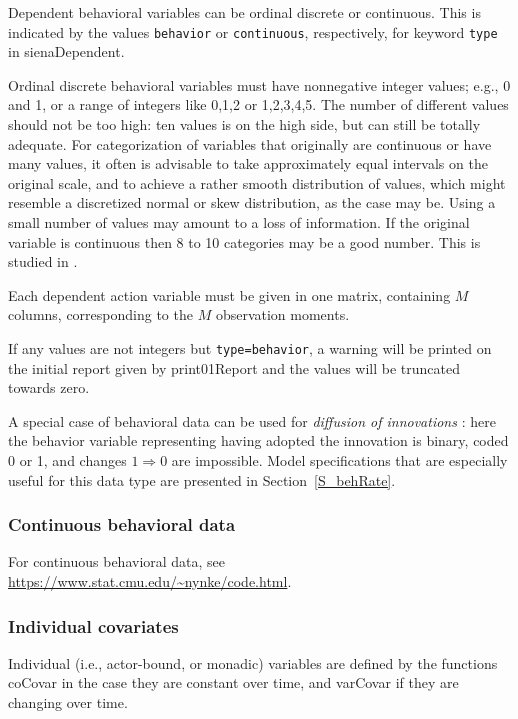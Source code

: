 \documentclass[a4paper,fleqn,11pt]{article}
\newcommand{\+}{\, + \,}
\newcommand{\sfn}[1]{\textsf{#1}}
\begin{document}
Dependent behavioral variables can be ordinal discrete or continuous.
This is indicated by the values \texttt{behavior}  or \texttt{continuous},
respectively, for keyword \texttt{type} in \sfn{sienaDependent}.

Ordinal discrete behavioral variables must have nonnegative integer values;
e.g., 0 and 1, or a range of integers like 0,1,2 or 1,2,3,4,5.
The number of different values should not be too high: ten values
is on the high side, but can still be totally adequate.
For categorization of variables that originally are
continuous or have many values, it often is advisable to take
approximately equal intervals on the original scale, and to achieve
a rather smooth distribution of values, which might resemble a
discretized normal or skew distribution, as the case may be.
Using a small number of values may amount to a loss of information.
If the original variable is continuous then 8 to 10 categories may be
a good number. This is studied in \citet[][Chapter 6]{Niezink2018a}.

Each dependent action variable must be given in one
matrix, containing $M$ columns, corresponding to the $M$
observation moments.

If any values are not integers but \texttt{type=behavior},
a warning will be printed on the initial report
given by \sfn{print01Report} and the values will be truncated towards zero.

A special case of behavioral data can be used for
\emph{diffusion of innovations} \citep{Greenan15}:
here the behavior variable representing
having adopted the innovation is binary, coded 0 or 1, and
changes $1 \Rightarrow 0$ are impossible.
Model specifications that are especially useful for this data type
are presented in Section~\ref{S_behRate}.


\subsubsection{Continuous behavioral data}

For continuous behavioral data,
see \url{https://www.stat.cmu.edu/~nynke/code.html}.


\subsubsection{Individual covariates}

Individual (i.e., actor-bound, or monadic) variables
are defined by the functions
\sfn{coCovar} in the case they are constant over time,
and \sfn{varCovar} if they are changing over time.
\end{document}
